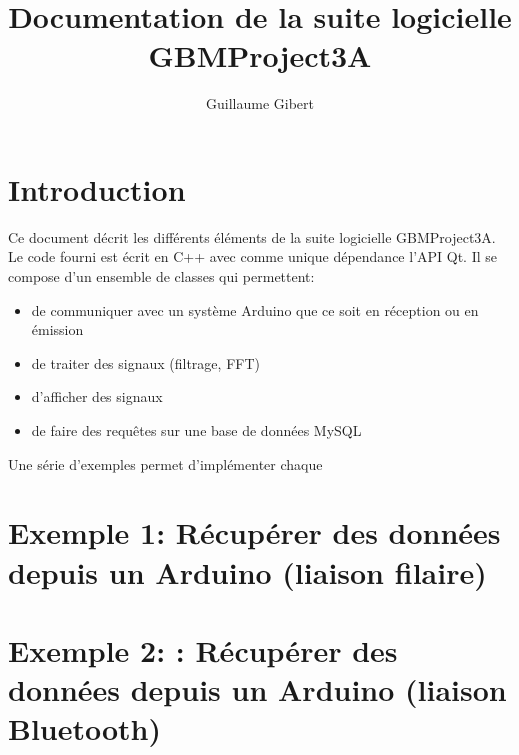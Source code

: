 \documentclass{article}
\begin{document}
\title{Documentation de la suite logicielle GBMProject3A}
\author{Guillaume Gibert}
\maketitle

\section{Introduction}
Ce document décrit les différents éléments de la suite logicielle GBMProject3A.
Le code fourni est écrit en C++ avec comme unique dépendance l'API Qt.
Il se compose d'un ensemble de classes qui permettent:
\begin{itemize}
\item de communiquer avec un système Arduino que ce soit en réception ou en émission 
\item de traiter des signaux (filtrage, FFT)
\item d'afficher des signaux
\item de faire des requêtes sur une base de données MySQL
\end{itemize}

Une série d'exemples permet d'implémenter chaque 

\section{Exemple 1: Récupérer des données depuis un Arduino (liaison filaire)}

\section{Exemple 2: : Récupérer des données depuis un Arduino (liaison Bluetooth)}

\end{document}
